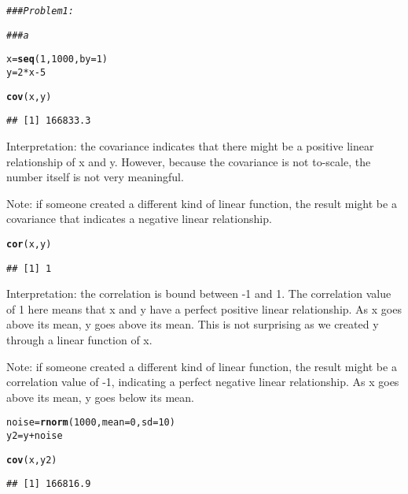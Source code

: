 \documentclass[12pt,letter]{article}\usepackage[]{graphicx}\usepackage[]{color}
\makeatletter
\newcommand{\hlnum}[1]{\textcolor[rgb]{0.686,0.059,0.569}{#1}}%
\newcommand{\hlcom}[1]{\textcolor[rgb]{0.678,0.584,0.686}{\textit{#1}}}%
\newcommand{\hlopt}[1]{\textcolor[rgb]{0,0,0}{#1}}%
\newcommand{\hlstd}[1]{\textcolor[rgb]{0.345,0.345,0.345}{#1}}%
\newcommand{\hlkwb}[1]{\textcolor[rgb]{0.69,0.353,0.396}{#1}}%
\newcommand{\hlkwc}[1]{\textcolor[rgb]{0.333,0.667,0.333}{#1}}%
\newcommand{\hlkwd}[1]{\textcolor[rgb]{0.737,0.353,0.396}{\textbf{#1}}}%
\newenvironment{kframe}{%
 \def\at@end@of@kframe{}%
 \ifinner\ifhmode%
  \def\at@end@of@kframe{\end{minipage}}%
  \begin{minipage}{\columnwidth}%
 \fi\fi%
 \def\FrameCommand##1{\hskip\@totalleftmargin \hskip-\fboxsep
 \colorbox{shadecolor}{##1}\hskip-\fboxsep
     \hskip-\linewidth \hskip-\@totalleftmargin \hskip\columnwidth}%
 \MakeFramed {\advance\hsize-\width
   \@totalleftmargin\z@ \linewidth\hsize
   \@setminipage}}%
 {\par\unskip\endMakeFramed%
 \at@end@of@kframe}
\newenvironment{knitrout}{}{} %
\makeatother
\begin{document}
\begin{knitrout}
\color{fgcolor}\begin{kframe}
\begin{alltt}
\hlcom{### Problem 1:}

\hlcom{### a}

\hlstd{x} \hlkwb{=} \hlkwd{seq}\hlstd{(}\hlnum{1}\hlstd{,} \hlnum{1000}\hlstd{,} \hlkwc{by} \hlstd{=} \hlnum{1}\hlstd{)}
\hlstd{y} \hlkwb{=} \hlnum{2} \hlopt{*} \hlstd{x} \hlopt{-} \hlnum{5}

\hlkwd{cov}\hlstd{(x, y)}
\end{alltt}
\begin{verbatim}
## [1] 166833.3
\end{verbatim}
\end{kframe}
\end{knitrout}

Interpretation: the covariance indicates that there might be a positive linear relationship of x and y. However, because the covariance is not to-scale, the number itself is not very meaningful.

Note: if someone created a different kind of linear function, the result might be a covariance that indicates a negative linear relationship.

\begin{knitrout}
\color{fgcolor}\begin{kframe}
\begin{alltt}
\hlkwd{cor}\hlstd{(x, y)}
\end{alltt}
\begin{verbatim}
## [1] 1
\end{verbatim}
\end{kframe}
\end{knitrout}

Interpretation: the correlation is bound between -1 and 1. The correlation value of 1 here means that x and y have a perfect positive linear relationship. As x goes above its mean, y goes above its mean. This is not surprising as we created y through a linear function of x.

Note: if someone created a different kind of linear function, the result might be a correlation value of -1, indicating a perfect negative linear relationship. As x goes above its mean, y goes below its mean.

\begin{knitrout}
\color{fgcolor}\begin{kframe}
\begin{alltt}
\hlstd{noise} \hlkwb{=} \hlkwd{rnorm}\hlstd{(}\hlnum{1000}\hlstd{,} \hlkwc{mean} \hlstd{=} \hlnum{0}\hlstd{,} \hlkwc{sd} \hlstd{=} \hlnum{10}\hlstd{)}
\hlstd{y2} \hlkwb{=} \hlstd{y} \hlopt{+} \hlstd{noise}

\hlkwd{cov}\hlstd{(x, y2)}
\end{alltt}
\begin{verbatim}
## [1] 166816.9
\end{verbatim}
\end{kframe}
\end{knitrout}
\end{document}
